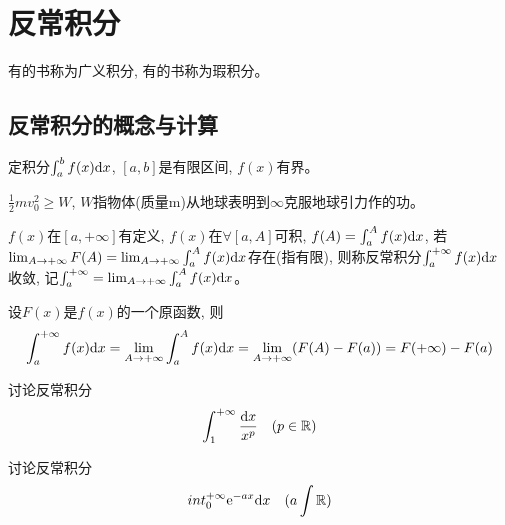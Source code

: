 \chapter{反常积分}
有的书称为广义积分, 有的书称为瑕积分。
\section{反常积分的概念与计算}
定积分$\int_a^b f(x) \mathrm{d} x$, $[a, b]$是有限区间, $f(x)$有界。

\begin{example}[第二宇宙速度]
    $\frac{1}{2}m v_0^2 \ge W$, $W$指物体(质量m)从地球表明到$\infty$克服地球引力作的功。
\end{example}
\begin{solution}

\end{solution}

\begin{definition}
    $f(x)$在$[a, +\infty]$有定义, $f(x)$在$\forall [a, A]$可积, $f(A) = \int_a^A f(x) \mathrm{d} x$, 若$\lim_{A \to +\infty } F(A) = \lim_{A \to +\infty } \int_a^A f(x) \mathrm{d} x$存在(指有限), 则称反常积分$\int_a^{+\infty} f(x) \mathrm{d} x$收敛, 记$\int_a^{+\infty} = \lim_{A \to +\infty } \int_a^A f(x) \mathrm{d} x$。

    设$F(x)$是$f(x)$的一个原函数, 则
    \begin{equation*}
        \int_a^{+\infty}f(x)\mathrm{d} x = \lim_{A \to +\infty } \int_a^Af(x) \mathrm{d} x = \lim_{A \to +\infty } (F(A) - F(a)) = F(+\infty) - F(a)
    \end{equation*}
\end{definition}

\begin{example}[P-积分]
    讨论反常积分
    \begin{equation*}
        \int_1^{+\infty} \frac{\mathrm{d} x}{x^p}\quad (p \in \mathbb{R})
    \end{equation*}
\end{example}
\begin{solution}
    
\end{solution}

\begin{example}
    讨论反常积分
    \begin{equation*}
        int_0^{+\infty} \mathrm{e}^{-ax} \mathrm{d} x \quad (a \int\mathbb{R})
    \end{equation*}
\end{example}
\begin{solution}
    
\end{solution}


